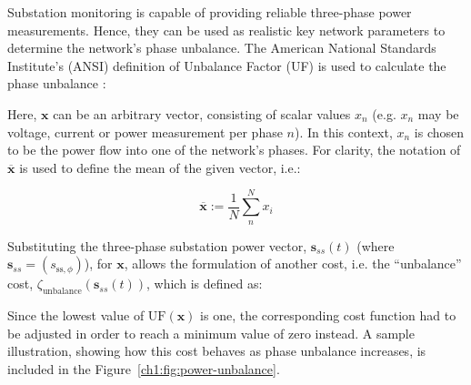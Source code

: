 
Substation monitoring is capable of providing reliable three-phase power measurements.
Hence, they can be used as realistic key network parameters to determine the network's phase unbalance.
The American National Standards Institute's (ANSI) definition of Unbalance Factor (UF) is used to calculate the phase unbalance \cite{ANSI-MB-1-2011}:



Here, $\textbf{x}$ can be an arbitrary vector, consisting of scalar values $x_n$ (e.g. $x_n$ may be voltage, current or power measurement per phase $n$).
In this context, $x_n$ is chosen to be the power flow into one of the network's phases.
For clarity, the notation of $\overline{\textbf{x}}$ is used to define the mean of the given vector, i.e.:

\begin{equation}
	\overline{\textbf{x}} := \frac{1}{N}\sum_n^N{x_i}
\end{equation}


Substituting the three-phase substation power vector, $\textbf{s}_{ss}(t)$ (where $\textbf{s}_{ss} = (s_{\text{ss},\phi})$), for $\textbf{x}$, allows the formulation of another cost, i.e. the ``unbalance'' cost, $\zeta_\text{unbalance}(\textbf{s}_{ss}(t))$, which is defined as:



Since the lowest value of $\text{UF}(\textbf{x})$ is one, the corresponding cost function had to be adjusted in order to reach a minimum value of zero instead.
A sample illustration, showing how this cost behaves as phase unbalance increases, is included in the Figure~\ref{ch1:fig:power-unbalance}.

